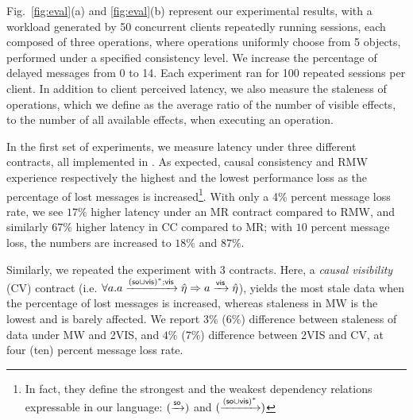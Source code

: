 
Fig.~\ref{fig:eval}(a) and \ref{fig:eval}(b) represent
our experimental results, with a workload generated 
by 50 concurrent clients repeatedly running sessions, each composed of three
operations, where operations uniformly choose from 5 objects,
performed under a specified consistency level. 
We increase the
percentage of delayed messages from 0 to 14.  Each experiment ran for
100 repeated sessions per client. In addition to client perceived
latency, we also measure the staleness of operations, which we define as
the average ratio of the number of visible effects,
to the number of all available effects, when executing an operation.

In the first set of experiments, we measure latency under
three different \LB{} contracts, all implemented in \tool. As
expected,
causal consistency and RMW experience respectively the highest and the
lowest
performance loss as the percentage of lost messages is increased\footnote{In fact, 
they define the strongest and the weakest
\LB{} dependency relations expressable in our language:
$(\xrightarrow{{\textsf{so}}})$ and $(\xrightarrow{({\textsf{so}}\cup{\normalfont \textsf{vis}})^*})$}.
With only a 4\% percent message loss rate, we see $17\%$ higher latency under an MR
contract compared to RMW, and similarly 67\% higher latency in CC
compared to MR; with $10$ percent message loss, the numbers are
increased to $18\%$ and $87\%$.


Similarly, we repeated the experiment with 3 \UB{} contracts. Here, a
\emph{causal visibility} (CV) contract (i.e. {\footnotesize $ \forall a.
a\xrightarrow{({\textsf{so}}\cup{\normalfont \textsf{vis}})^*;{\normalfont \textsf{vis}}}\hat{\eta}\Rightarrow a\xrightarrow{{\normalfont \textsf{vis}}}
\hat{\eta} $}), yields the most stale data when the percentage of lost
messages is increased, whereas staleness in MW is the lowest and is
barely affected. We report $3\%$ ($6\%$) difference 
between staleness of data under MW and 2VIS, and $4\%$ ($7\%$)
difference between 2VIS and CV,
at four (ten) percent message
loss rate.




